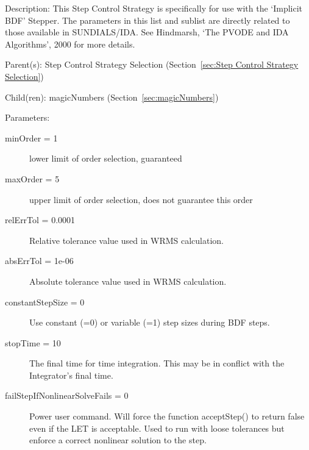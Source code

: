 \begin{list}{}
  {\setlength{\leftmargin}{1.0in}
   \setlength{\labelwidth}{0.75in}
   \setlength{\labelsep}{0.125in}}
  \item[Description:]
    This Step Control Strategy is specifically for use with the `Implicit BDF' Stepper.  The parameters in this list and sublist are directly related to those available in SUNDIALS/IDA.  See Hindmarsh, `The PVODE and IDA Algorithms', 2000 for more details.
  \item[Parent(s):]
    Step Control Strategy Selection (Section~\ref{sec:Step Control Strategy Selection})
  \item[Child(ren):]
    magicNumbers (Section~\ref{sec:magicNumbers})
  \item[Parameters:]
    \begin{description}
      \item[minOrder = 1] 
lower limit of order selection, guaranteed
      \item[maxOrder = 5] 
upper limit of order selection, does not guarantee this order
      \item[relErrTol = 0.0001] 
Relative tolerance value used in WRMS calculation.
      \item[absErrTol = 1e-06] 
Absolute tolerance value used in WRMS calculation.
      \item[constantStepSize = 0] 
Use constant (=0) or variable (=1) step sizes during BDF steps.
      \item[stopTime = 10] 
The final time for time integration.  This may be in conflict with the Integrator's final time.
      \item[failStepIfNonlinearSolveFails = 0] 
Power user command. Will force the function acceptStep() to return false even if the LET is acceptable.  Used to run with loose tolerances but enforce a correct nonlinear solution to the step.
\end{description}

\end{list}

